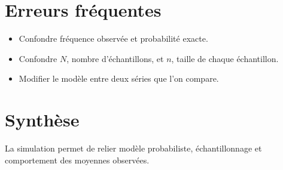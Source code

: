 \section{Erreurs fréquentes}
\begin{itemize}
\item Confondre fréquence observée et probabilité exacte.
\item Confondre $N$, nombre d’échantillons, et $n$, taille de chaque échantillon.
\item Modifier le modèle entre deux séries que l’on compare.
\end{itemize}

\section{Synthèse}
La simulation permet de relier modèle probabiliste, échantillonnage et comportement des moyennes observées.
